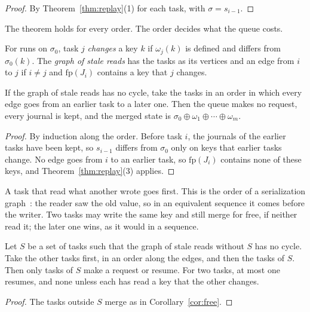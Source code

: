 \documentclass[acmsmall,nonacm,screen]{acmart}
\newcommand{\fp}[1]{\mathrm{fp}(#1)}
\newcommand{\upd}{\oplus}
\begin{document}
\begin{proof}
By Theorem~\ref{thm:replay}(1) for each task, with $\sigma = s_{i-1}$.
\end{proof}

The theorem holds for every order. The order decides what the queue costs.

\begin{definition}
\label{def:graph}
For runs on $\sigma_0$, task $j$ \emph{changes} a key $k$ if $\omega_j(k)$ is defined and
differs from $\sigma_0(k)$. The \emph{graph of stale reads} has the tasks as its vertices and
an edge from $i$ to $j$ if $i \ne j$ and $\fp{J_i}$ contains a key that $j$ changes.
\end{definition}

\begin{corollary}
\label{cor:free}
If the graph of stale reads has no cycle, take the tasks in an order in which every edge goes
from an earlier task to a later one. Then the queue makes no request, every journal is kept,
and the merged state is $\sigma_0 \upd \omega_1 \upd \cdots \upd \omega_m$.
\end{corollary}

\begin{proof}
By induction along the order. Before task $i$, the journals of the earlier tasks have been
kept, so $s_{i-1}$ differs from $\sigma_0$ only on keys that earlier tasks change. No edge
goes from $i$ to an earlier task, so $\fp{J_i}$ contains none of these keys, and
Theorem~\ref{thm:replay}(3) applies.
\end{proof}

A task that read what another wrote goes first. This is the order of a serialization
graph~\citep{fekete2005}: the reader saw the old value, so in an equivalent sequence it comes
before the writer. Two tasks may write the same key and still merge for free, if neither
read it; the later one wins, as it would in a sequence.

\begin{corollary}
\label{cor:feedback}
Let $S$ be a set of tasks such that the graph of stale reads without $S$ has no cycle. Take
the other tasks first, in an order along the edges, and then the tasks of $S$. Then only
tasks of $S$ make a request or resume. For two tasks, at most one resumes, and none unless
each has read a key that the other changes.
\end{corollary}

\begin{proof}
The tasks outside $S$ merge as in Corollary~\ref{cor:free}.
\end{proof}
\end{document}
